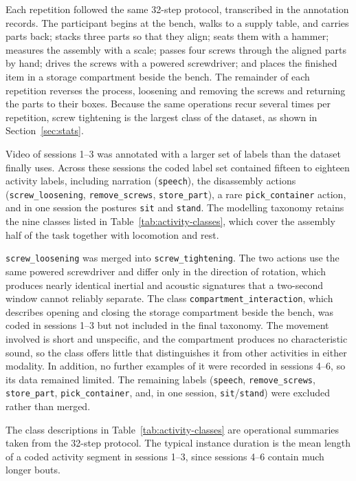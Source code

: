 Each repetition followed the same 32-step protocol, transcribed in the annotation
records. The participant begins at the bench, walks to a supply table, and
carries parts back; stacks three parts so that they align; seats them with a
hammer; measures the assembly with a scale; passes four screws through the
aligned parts by hand; drives the screws with a powered screwdriver; and places
the finished item in a storage compartment beside the bench. The remainder of
each repetition reverses the process, loosening and removing the screws and
returning the parts to their boxes. Because the same operations recur several
times per repetition, screw tightening is the largest class of the dataset, as
shown in Section~\ref{sec:stats}.

Video of sessions 1--3 was annotated with a larger set of labels than the dataset
finally uses. Across these sessions the coded label set contained fifteen to
eighteen activity labels, including narration (\texttt{speech}), the disassembly
actions (\texttt{screw\_loosening}, \texttt{remove\_screws}, \texttt{store\_part}),
a rare \texttt{pick\_container} action, and in one session the postures
\texttt{sit} and \texttt{stand}. The modelling taxonomy retains the nine classes
listed in Table~\ref{tab:activity-classes}, which cover the assembly half of the
task together with locomotion and rest.

\texttt{screw\_loosening} was merged into \texttt{screw\_tightening}. The two
actions use the same powered screwdriver and differ only in the direction of
rotation, which produces nearly identical inertial and acoustic signatures that a
two-second window cannot reliably separate. The class
\texttt{compartment\_interaction}, which describes opening and closing the storage
compartment beside the bench, was coded in sessions 1--3 but not included in the
final taxonomy. The movement involved is short and unspecific, and the compartment
produces no characteristic sound, so the class offers little that distinguishes
it from other activities in either modality. In addition, no further examples of
it were recorded in sessions 4--6, so its data remained limited. The remaining
labels (\texttt{speech}, \texttt{remove\_screws}, \texttt{store\_part},
\texttt{pick\_container}, and, in one session, \texttt{sit}/\texttt{stand}) were
excluded rather than merged.

The class descriptions in Table~\ref{tab:activity-classes} are operational
summaries taken from the 32-step protocol. The typical instance duration is the
mean length of a coded activity segment in sessions 1--3, since sessions 4--6
contain much longer bouts.

